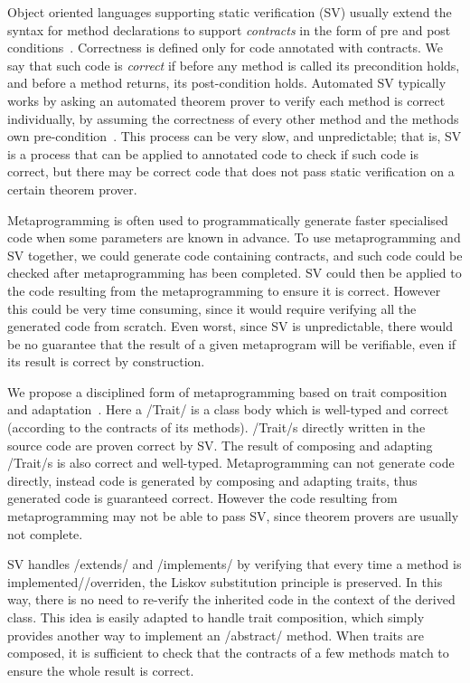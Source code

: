 \noindent Object oriented languages supporting static verification (SV) usually extend the syntax for method declarations
to support \emph{contracts} in the form of pre and post conditions~\cite{Meyer:1988:OSC:534929}.
Correctness is defined only for code annotated with contracts.
We say that such code is \emph{correct} if 
before any method is called its precondition holds, and before a method returns, its post-condition holds.
Automated SV typically works by asking an automated theorem prover to verify each method is correct individually, by assuming the correctness of every other method and the methods own pre-condition~\cite{barnett2004spec}. This process can be very slow, and unpredictable;
that is, SV is a process that can be applied to annotated code
to check if such code is correct, but there may be correct code that does not pass static verification
 on a certain theorem prover.

Metaprogramming is often used to programmatically generate faster specialised code 
when some parameters are known in advance. %
To use metaprogramming and SV together, we could generate code
containing contracts, and such code could be checked after metaprogramming has been completed.
SV could then be applied to the code resulting from the metaprogramming to ensure it is correct.
However this could be very time consuming, since it would require verifying all the generated code from scratch.
Even worst, since SV is unpredictable, there would be no guarantee that the result of a given metaprogram will be verifiable, even if its result is correct by construction.

We propose a disciplined form of metaprogramming based on trait composition and adaptation~\cite{scharli2003traits,servetto2014meta}.
Here a /Trait/ is a class body which is well-typed and correct (according to the contracts of its methods).
/Trait/s directly written in the source code
are proven correct by SV.
The result of composing and adapting /Trait/s is also correct and well-typed.
Metaprogramming can not generate code directly, instead code is generated by composing and adapting traits, thus generated code is guaranteed correct.
However the code resulting from metaprogramming may not be able to pass SV, since theorem provers are usually not complete.

SV handles /extends/ and /implements/ by verifying that every 
time a method is implemented//overriden, 
the Liskov substitution principle is preserved. In this way, there is no need to re-verify
the inherited code in the context of the derived class.
This idea is easily adapted
to handle trait composition, which simply provides another way to implement an /abstract/ method.
When traits are composed,
it is sufficient
to check that the contracts of a few methods match 
to ensure the whole result is correct. 

